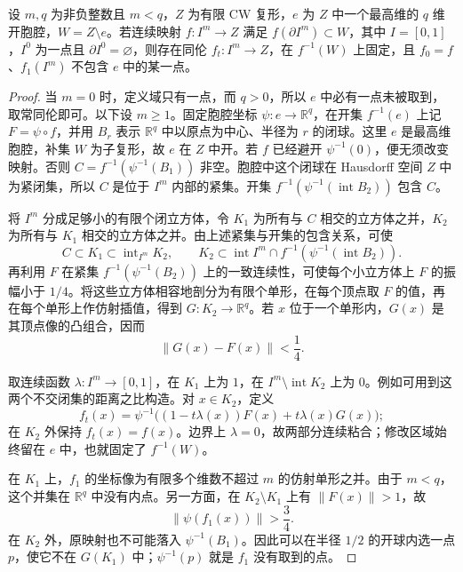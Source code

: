\begin{lemma}\label{g2:lem:cell-local-avoidance}
	设 \(m,q\) 为非负整数且 \(m<q\)，\(Z\) 为有限 CW 复形，\(e\) 为 \(Z\) 中一个最高维的 \(q\) 维开胞腔，\(W=Z\setminus e\)。若连续映射 \(f:I^m\to Z\) 满足 \(f(\partial I^m)\subset W\)，其中 \(I=[0,1]\)，\(I^0\) 为一点且 \(\partial I^0=\varnothing\)，则存在同伦 \(f_t:I^m\to Z\)，在 \(f^{-1}(W)\) 上固定，且 \(f_0=f\)、\(f_1(I^m)\) 不包含 \(e\) 中的某一点。
\end{lemma}
\begin{proof}
	当 \(m=0\) 时，定义域只有一点，而 \(q>0\)，所以 \(e\) 中必有一点未被取到，取常同伦即可。以下设 \(m\ge1\)。固定胞腔坐标 \(\psi:e\to\mathbb R^q\)，在开集 \(f^{-1}(e)\) 上记 \(F=\psi\circ f\)，并用 \(B_r\) 表示 \(\mathbb R^q\) 中以原点为中心、半径为 \(r\) 的闭球。这里 \(e\) 是最高维胞腔，补集 \(W\) 为子复形，故 \(e\) 在 \(Z\) 中开。若 \(f\) 已经避开 \(\psi^{-1}(0)\)，便无须改变映射。否则 \(C=f^{-1}(\psi^{-1}(B_1))\) 非空。胞腔中这个闭球在 Hausdorff 空间 \(Z\) 中为紧闭集，所以 \(C\) 是位于 \(I^m\) 内部的紧集。开集 \(f^{-1}(\psi^{-1}(\operatorname{int}B_2))\) 包含 \(C\)。

	将 \(I^m\) 分成足够小的有限个闭立方体，令 \(K_1\) 为所有与 \(C\) 相交的立方体之并，\(K_2\) 为所有与 \(K_1\) 相交的立方体之并。由上述紧集与开集的包含关系，可使
	\[
		C\subset K_1\subset\operatorname{int}_{I^m}K_2,
		\qquad
		K_2\subset\operatorname{int}I^m\cap f^{-1}(\psi^{-1}(\operatorname{int}B_2)).
	\]
	再利用 \(F\) 在紧集 \(f^{-1}(\psi^{-1}(B_2))\) 上的一致连续性，可使每个小立方体上 \(F\) 的振幅小于 \(1/4\)。将这些立方体相容地剖分为有限个单形，在每个顶点取 \(F\) 的值，再在每个单形上作仿射插值，得到 \(G:K_2\to\mathbb R^q\)。若 \(x\) 位于一个单形内，\(G(x)\) 是其顶点像的凸组合，因而
	\[
		\lVert G(x)-F(x)\rVert<\frac14.
	\]

	取连续函数 \(\lambda:I^m\to[0,1]\)，在 \(K_1\) 上为 \(1\)，在 \(I^m\setminus\operatorname{int}K_2\) 上为 \(0\)。例如可用到这两个不交闭集的距离之比构造。对 \(x\in K_2\)，定义
	\[
		f_t(x)=\psi^{-1}\bigl((1-t\lambda(x))F(x)+t\lambda(x)G(x)\bigr);
	\]
	在 \(K_2\) 外保持 \(f_t(x)=f(x)\)。边界上 \(\lambda=0\)，故两部分连续粘合；修改区域始终留在 \(e\) 中，也就固定了 \(f^{-1}(W)\)。

	在 \(K_1\) 上，\(f_1\) 的坐标像为有限多个维数不超过 \(m\) 的仿射单形之并。由于 \(m<q\)，这个并集在 \(\mathbb R^q\) 中没有内点。另一方面，在 \(K_2\setminus K_1\) 上有 \(\lVert F(x)\rVert>1\)，故
	\[
		\lVert \psi(f_1(x))\rVert>\frac34.
	\]
	在 \(K_2\) 外，原映射也不可能落入 \(\psi^{-1}(B_1)\)。因此可以在半径 \(1/2\) 的开球内选一点 \(p\)，使它不在 \(G(K_1)\) 中；\(\psi^{-1}(p)\) 就是 \(f_1\) 没有取到的点。
\end{proof}

